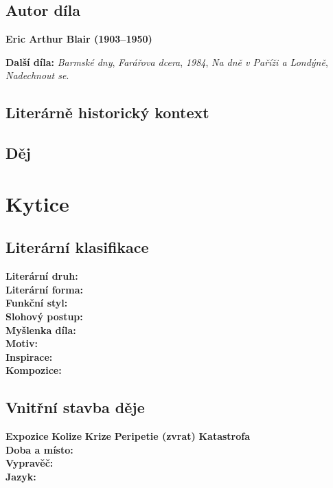 \documentclass[12pt, a4paper]{article}
\newcommand{\mybf}[1]{\textcolor[RGB]{0, 179, 219}{\textbf{#1}}}
\begin{document}
\subsection*{Autor díla}
\textbf{Eric Arthur Blair (1903--1950)}

\textbf{Další díla:} \textit{Barmské dny}, \textit{Farářova dcera}, \textit{1984}, \textit{Na dně v Paříži a Londýně}, \textit{Nadechnout se}.

\subsection*{Literárně historický kontext}

{\color{subsectioncolor}\hrulefill}
\subsection*{\color{subsectioncolor}Děj}

\newpage


\section{Kytice}

\subsection*{Literární klasifikace}
\mybf{Literární druh:} \\[3pt]
\mybf{Literární forma:} \\[3pt]
\mybf{Funkční styl:} \\[3pt]
\mybf{Slohový postup:} \\[10pt]
\mybf{Myšlenka díla:} \\[10pt]
\mybf{Motiv:} \\[10pt]
\mybf{Inspirace:} \\[10pt]
\mybf{Kompozice:} 

\subsection*{Vnitřní stavba děje}
\noindent\textbf{Expozice} 
\noindent\textbf{Kolize} 
\noindent\textbf{Krize} 
\noindent\textbf{Peripetie (zvrat)} 
\noindent\textbf{Katastrofa} \\[10pt]
\mybf{Doba a místo:} \\[10pt]
\mybf{Vypravěč:} \\[10pt]
\mybf{Jazyk:} 
\end{document}
